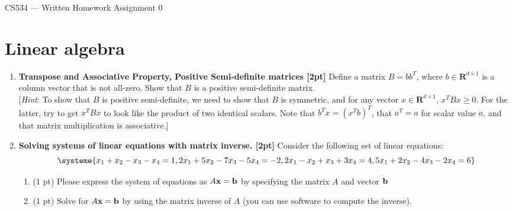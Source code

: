 \documentclass{article}
\def\x{{\bf x}}
\begin{document}
{\Large
\begin{center}
CS534 --- Written Homework Assignment 0 \\
\end{center}
}
\section*{Linear algebra}

\begin{enumerate}
\item \textbf{Transpose and Associative Property, Positive Semi-definite matrices [2pt]}
Define a matrix $B = b{b^T}$, where $b \in \mathbf{R}^{d\times1}$ is a column vector that is not all-zero. Show that $B$ is a positive semi-definite matrix.\\

[\emph{Hint}: To show that $B$ is positive semi-definite, we need to show that $B$ is symmetric, and  for any vector $x\in \mathbf{R}^{d\times1}$, $x^TBx \geq 0$. For the latter, try to get $x^TBx$ to look like the product of two identical scalars. Note that $b^Tx = (x^Tb)^T$, that $a^T=a$ for scalar value $a$, and that matrix multiplication is associative.]\\
\item \textbf{Solving systems of linear equations with matrix inverse. [2pt]} Consider the following set of linear equations:
    \begin{equation*}
    \systeme{
    x_1  + x_2 - x_3 - x_4  =1, 
    2x_1 + 5x_2- 7x_3- 5x_4 =-2, 
    2x_1 - x_2 + x_3 + 3x_4 =4, 
    5x_1 + 2x_2 - 4x_3- 2x_4 =6}        
    \end{equation*}
    
    \begin{enumerate}
        \item (1 pt) Please express the system of equations as $A\x={\bf b}$ by specifying the matrix $A$ and vector ${\bf b}$\\

       
        \item (1 pt) Solve for $A\x={\bf b}$ by using the matrix inverse of $A$ (you can use software to compute the inverse).  \\
    \end{enumerate}
\end{enumerate}
\end{document}
